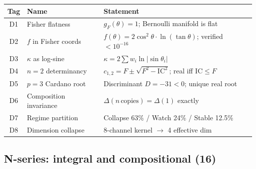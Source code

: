 \documentclass[
  aps,
  prd,
  twocolumn,
  superscriptaddress,
  nofootinbib,
  floatfix
]{revtex4-2}
\newcommand{\IC}{\mathrm{IC}}
\newcommand{\gF}{g_{\!F}}
\begin{document}
{\small
\begin{center}
\begin{tabular}{@{}clP{3.5cm}@{}}
\toprule
Tag & Name & Statement \\
\midrule
D1 & Fisher flatness &
  $\gF(\theta) = 1$; Bernoulli manifold is flat \\
D2 & $f$ in Fisher coords &
  $f(\theta) = 2\cos^2\theta \cdot \ln(\tan\theta)$;
  verified $< 10^{-16}$ \\
D3 & $\kappa$ as log-sine &
  $\kappa = 2\sum w_i \ln|\sin\theta_i|$ \\
D4 & $n{=}2$ determinancy &
  $c_{1,2} = F \pm \sqrt{F^2 - \IC^2}$;
  real iff $\IC \leq F$ \\
D5 & $p{=}3$ Cardano root &
  Discriminant $D = -31 < 0$; unique real root \\
D6 & Composition invariance &
  $\Delta(n\,\mathrm{copies}) = \Delta(1)$ exactly \\
D7 & Regime partition &
  Collapse 63\% / Watch 24\% / Stable 12.5\% \\
D8 & Dimension collapse &
  8-channel kernel $\to$ 4 effective dim \\
\bottomrule
\end{tabular}
\end{center}}

\subsection{N-series: integral and compositional (16)}
\end{document}
